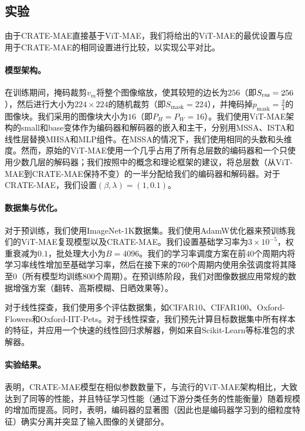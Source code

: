 \documentclass[../../book-main_zh.tex]{subfiles}
\begin{document}
\subsection{实验}\label{sub:image_completion_experiments}

由于CRATE-MAE直接基于ViT-MAE，我们将\citep{he2022masked}给出的ViT-MAE的最优设置与应用于CRATE-MAE的相同设置进行比较，以实现公平对比。

\paragraph{模型架构。} 在训练期间，掩码裁剪\(v_{m}\)将整个图像缩放，使其较短的边长为\(256\)（即\(S_{\mathrm{rsz}} = 256\)），然后进行大小为\(224 \times 224\)的随机裁剪（即\(S_{\mathrm{mask}} = 224\)），并掩码掉\(p_{\mathrm{mask}} = \frac{3}{4}\)的图像块。我们采用的图像块大小为\(16\)（即\(P_{H} = P_{W} = 16\)）。我们使用ViT-MAE架构的small和base变体作为编码器和解码器的嵌入和主干，分别用MSSA、ISTA和线性层替换MHSA和MLP组件。在MSSA的情况下，我们使用相同的头数和头维度。然而，原始的ViT-MAE使用一个几乎占用了所有总层数的编码器和一个只使用少数几层的解码器；我们按照中的概念和理论框架的建议，将总层数（从ViT-MAE到CRATE-MAE保持不变）的一半分配给我们的编码器和解码器。对于CRATE-MAE，我们设置\((\beta, \lambda) = (1, 0.1)\)。

\paragraph{数据集与优化。} 对于预训练，我们使用ImageNet-1K数据集。我们使用AdamW优化器来预训练我们的ViT-MAE复现模型以及CRATE-MAE。我们设置基础学习率为\(3 \times 10^{-5}\)，权重衰减为\(0.1\)，批处理大小为\(B = 4096\)。我们的学习率调度方案在前\(40\)个周期内将学习率线性增加至基础学习率，然后在接下来的\(760\)个周期内使用余弦调度将其降至\(0\)（所有模型均训练\(800\)个周期）。在预训练阶段，我们对图像数据应用常规的数据增强方案（翻转、高斯模糊、日晒效果等）。

对于线性探查，我们使用多个评估数据集，如CIFAR10、CIFAR100、Oxford-Flowers和Oxford-IIT-Pets。对于线性探查，我们预先计算目标数据集中所有样本的特征，并应用一个快速的线性回归求解器，例如来自Scikit-Learn等标准包的求解器。

\paragraph{实验结果。} 表明，CRATE-MAE模型在相似参数数量下，与流行的ViT-MAE架构相比，大致达到了同等的性能，并且特征学习性能（通过下游分类任务的性能衡量）随着规模的增加而提高。同时，表明，编码器的显著图（因此也是编码器学习到的细粒度特征）确实分离并突显了输入图像的关键部分。
\end{document}

